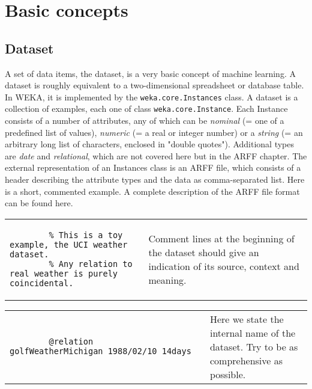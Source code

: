 \newpage
\section{Basic concepts}

\subsection{Dataset}

A set of data items, the dataset, is a very basic concept of machine learning. A dataset is roughly equivalent to a two-dimensional spreadsheet or database table. In WEKA, it is implemented by the \texttt{weka.core.Instances} class. A dataset is a collection of examples, each one of class \texttt{weka.core.Instance}. Each Instance consists of a number of attributes, any of which can be \textit{nominal} (= one of a predefined list of values), \textit{numeric} (= a real or integer number) or a \textit{string} (= an arbitrary long list of characters, enclosed in "double quotes"). Additional types are \textit{date} and \textit{relational}, which are not covered here but in the ARFF chapter. The external representation of an Instances class is an ARFF file, which consists of a header describing the attribute types and the data as comma-separated list. Here is a short, commented example. A complete description of the ARFF file format can be found here.

\vspace{0.5cm}
\noindent
\begin{tabular}{l l}
	\begin{minipage}{7cm}
		{\scriptsize
		\begin{verbatim}
		% This is a toy example, the UCI weather dataset.
		% Any relation to real weather is purely coincidental.
		\end{verbatim}}
	\end{minipage}
	&
	\begin{minipage}{5cm}
	Comment lines at the beginning of the dataset should give an indication of its source, context and meaning.
	\end{minipage}
	\\
\end{tabular}

\vspace{0.5cm}
\noindent
\begin{tabular}{l l}
	\begin{minipage}{7cm}
		{\scriptsize
		\begin{verbatim}
		@relation golfWeatherMichigan_1988/02/10_14days
		\end{verbatim}}
	\end{minipage}
	&
	\begin{minipage}{5cm}
	Here we state the internal name of the dataset. Try to be as comprehensive as possible.
	\end{minipage}
	\\
\end{tabular}

